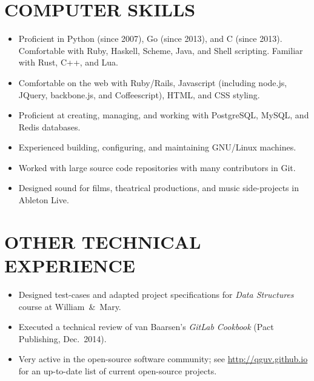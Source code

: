 \documentclass{res}     %
\begin{document}
\begin{resume}

\section{COMPUTER SKILLS}
\vspace{5mm}
\begin{itemize}[leftmargin=5mm]
\item Proficient in Python (since 2007), Go (since 2013), and C (since 2013). Comfortable with Ruby, Haskell, Scheme, Java, and Shell scripting. Familiar with Rust, C++, and Lua.
\item Comfortable on the web with Ruby/Rails, Javascript (including node.js, JQuery, backbone.js, and Coffeescript), HTML, and CSS styling.
\item Proficient at creating, managing, and working with PostgreSQL, MySQL, and Redis databases.
\item Experienced building, configuring, and maintaining GNU/Linux machines.
\item Worked with large source code repositories with many contributors in Git.
\item Designed sound for films, theatrical productions, and music side-projects in Ableton Live.
\end{itemize}
 
\section{OTHER TECHNICAL EXPERIENCE}
\vspace{5mm}
\begin{itemize}[leftmargin=5mm]
\item Designed test-cases and adapted project specifications for \emph{Data Structures} course at William~\&~Mary.
\item Executed a technical review of van Baarsen's \emph{GitLab Cookbook} (Pact Publishing, Dec.\ 2014).
\item Very active in the open-source software community; see \url{http://qguv.github.io} for an up-to-date list of current open-source projects.
\end{itemize}


\end{resume}
\end{document}
